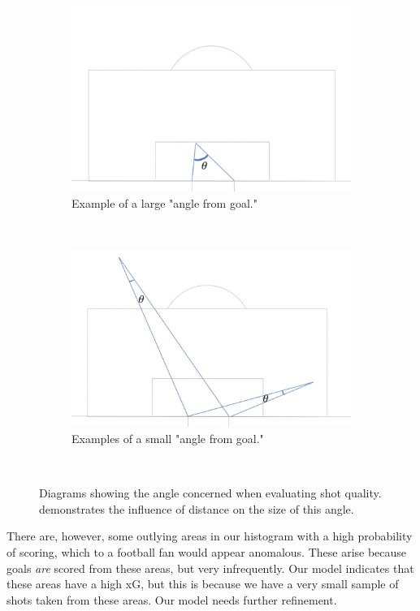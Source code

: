 \documentclass{l4proj}
\begin{document}
\begin{figure}[htb] 
    \centering
    \begin{subfigure}[b]{0.45\textwidth}
        \includegraphics[width=\textwidth]{images/wideangle.png}
        \caption{Example of a large "angle from goal."}
        \label{fig:bigang}
    \end{subfigure}
    ~
    \begin{subfigure}[b]{0.45\textwidth}
        \includegraphics[width=\textwidth]{images/tightangle.png}
        \caption{Examples of a small "angle from goal."}
        \label{fig:smallang}
    \end{subfigure}
    ~   
    \caption{Diagrams showing the angle concerned when evaluating shot quality.  demonstrates the influence of distance on the size of this angle.}
    \label{fig:angles}
\end{figure}

There are, however, some outlying areas in our histogram with a high probability of scoring, which to a football fan would appear anomalous. These arise because goals \textit{are} scored from these areas, but very infrequently. Our model indicates that these areas have a high xG, but this is because we have a very small sample of shots taken from these areas. Our model needs further refinement.
\end{document}
